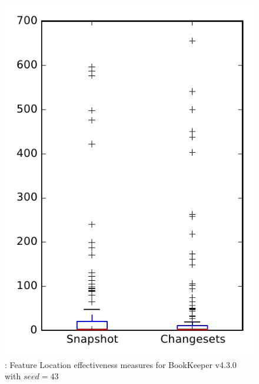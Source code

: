 
\begin{figure}
\centering
\includegraphics[height=0.4\textheight]{figures/flt_seed/rq1_bookkeeper_43}
\caption{\rone: Feature Location effectiveness measures for BookKeeper v4.3.0 with $seed=43$}
\label{fig:flt_seed:rq1:bookkeeper}
\end{figure}
